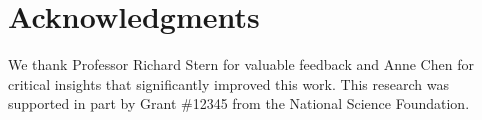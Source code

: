 \section*{Acknowledgments}

We thank Professor Richard Stern for valuable feedback and Anne Chen for critical insights that significantly improved this work. This research was supported in part by Grant \#12345 from the National Science Foundation. 